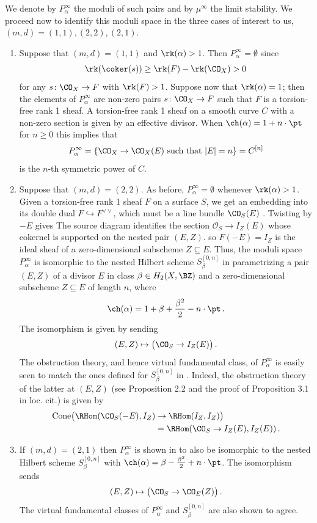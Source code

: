 We denote by $P_\alpha^\infty$ the moduli of such pairs and by $\mu^\infty$ the limit stability. We proceed now to identify this moduli space in the three cases of interest to us, $(m,d)=(1,1), (2,2), (2,1)$.
\begin{enumerate}
\item Suppose that $(m,d)=(1,1)$ and $\rk(\alpha)>1$. Then $P_\alpha^\infty=\emptyset$ since \[\rk(\coker(s))\geq \rk(F)-\rk(\CO_X)>0\] for any $s\colon \CO_X\to F$ with $\rk(F)>1$.  Suppose now that $\rk(\alpha)=1$; then the elements of $P_\alpha^\infty$ are non-zero pairs $s\colon \CO_X\to F$ such that $F$ is a torsion-free rank 1 sheaf. A torsion-free rank 1 sheaf on a smooth curve $C$ with a non-zero section is given by an effective divisor. When $\ch(\alpha)=1+n \cdot \pt$ for $n\geq 0$ this implies that
\[P^\infty_{\alpha}=\{\CO_X\to \CO_{X}(E)\textup{ such that }|E|=n\}=C^{[n]}\]
is the $n$-th symmetric power of $C$.

\item Suppose that $(m,d)=(2,2)$. As before, $P_\alpha^\infty=\emptyset$ whenever $\rk(\alpha)>1$. Given a torsion-free rank 1 sheaf $F$ on a surface $S$, we get an embedding into its double dual $F\hookrightarrow F^{\vee\vee}$, which must be a line bundle $\CO_S(E)$ \cite[Example 1.1.16]{HL}. Twisting by $-E$ gives
The source diagram identifies the section $\mathcal O_S\to I_Z(E)$ whose
cokernel is supported on the nested pair $(E,Z)$.
so $F(-E)=I_Z$ is the ideal sheaf of a zero-dimensional subscheme $Z\subseteq E$. Thus, the moduli space $P_{\alpha}^\infty$ is isomorphic to the nested Hilbert scheme $S_\beta^{[0,n]}$ in \cite{gsy} parametrizing a pair $(E,Z)$ of a divisor $E$ in class $\beta\in H_2(X, \BZ)$ and a zero-dimensional subscheme $Z\subseteq E$ of length $n$, where
\[\ch(\alpha)=1+\beta+\frac{\beta^2}{2}-n\cdot \pt\,.\]
The isomorphism is given by sending
\[(E,Z)\mapsto \big(\CO_S\to I_Z(E)\big)\,.\]
The obstruction theory, and hence virtual fundamental class, of $P_\alpha^\infty$ is easily seen to match the ones defined for $S_\beta^{[0,n]}$ in \cite{gsy}. Indeed, the obstruction theory of the latter at $(E,Z)$ (see Proposition 2.2 and the proof of Proposition 3.1 in loc. cit.) is given by
\begin{align*}\textrm{Cone}\big(\RHom(\CO_S(-E), I_Z)&\to \RHom(I_Z, I_Z)\big)\\
&=\RHom(\CO_S\to I_Z(E), I_Z(E))\,.\end{align*}

\item  If $(m,d)=(2,1)$ then $P_{\alpha}^\infty$ is shown in \cite[Proposition 3.1.5]{gsy} to also be isomorphic to the nested Hilbert scheme $S_\beta^{[0,n]}$ with $\ch(\alpha)=\beta-\frac{\beta^2}{2}+n\cdot \pt$. The isomorphism sends
\[(E, Z)\mapsto \big(\CO_S\to \CO_E(Z)\big)\,.\]
The virtual fundamental classes of $P^\infty_\alpha$ and $S_\beta^{[0,n]}$ are also shown to agree.
\end{enumerate}






